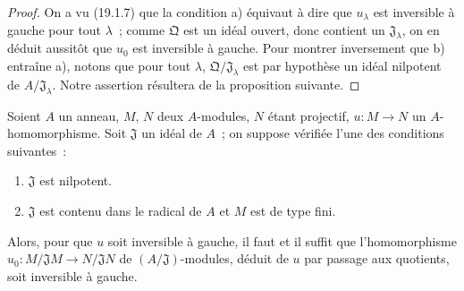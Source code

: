 \begin{proof}
On a vu (19.1.7) que la condition a) équivaut à dire que $u_\lambda$ est
inversible à gauche pour tout $\lambda$~; comme $\mathfrak Q$ est un idéal
ouvert, donc contient un $\mathfrak J_\lambda$, on en déduit aussitôt que
$u_0$ est inversible à gauche. Pour montrer inversement que b) entraîne a),
notons que pour tout $\lambda$, $\mathfrak Q/\mathfrak J_\lambda$ est par
hypothèse un idéal nilpotent de $A/\mathfrak J_\lambda$. Notre assertion
résultera de la proposition suivante.
\end{proof}

\begin{proposition}[19.1.10]
\label{0.19.1.10-fr}
Soient $A$ un anneau, $M$, $N$ deux $A$-modules, $N$ étant projectif,
$u:M\to N$ un $A$-homomorphisme. Soit $\mathfrak J$ un idéal de $A$~; on
suppose vérifiée l'une des conditions suivantes~:
\begin{enumerate}
  \item[(i)] $\mathfrak J$ est nilpotent.
  \item[(ii)] $\mathfrak J$ est contenu dans le radical de $A$ et $M$ est de
  type fini.
\end{enumerate}
Alors, pour que $u$ soit inversible à gauche, il faut et il suffit que
l'homomorphisme
$u_0:M/\mathfrak JM\to N/\mathfrak JN$ de $(A/\mathfrak J)$-modules, déduit
de $u$ par passage aux quotients, soit inversible à gauche.
\end{proposition}

